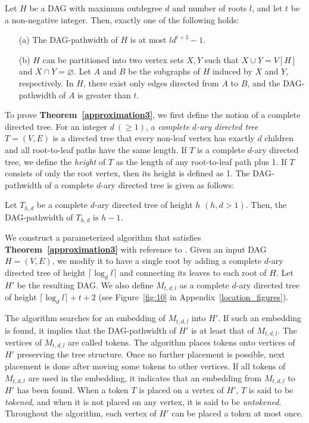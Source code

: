 \documentclass[runningheads]{llncs}
\theoremstyle{plain}
\theoremstyle{definition}
\begin{document}
\begin{theorem}\label{approximation3}
    Let $H$ be a DAG with maximum outdegree $d$ and number of roots $l$, and let $t$ be a non-negative integer. Then, exactly one of the following holds:
    \begin{enumerate}
        \item[(a)] The DAG-pathwidth of $H$ is at most $ld^{t+3}-1$.
        \item[(b)] $H$ can be partitioned into two vertex sets $X, Y$ such that $X \cup Y = V[H]$ and $X \cap Y = \varnothing$. Let $A$ and $B$ be the subgraphs of $H$ induced by $X$ and $Y$, respectively. In $H$, there exist only edges directed from $A$ to $B$, and the DAG-pathwidth of $A$ is greater than $t$.
    
    \end{enumerate}
\end{theorem}

To prove \textbf{Theorem~\ref{approximation3}}, we first define the notion of a complete directed tree. For an integer $d~(\geq 1)$, a \emph{complete $d$-ary directed tree} $T=(V, E)$ is a directed tree that every non-leaf vertex has exactly $d$ children and all root-to-leaf paths have the same length. If $T$ is a complete $d$-ary directed tree, we define the \emph{height} of $T$ as the length of any root-to-leaf path plus 1. If $T$ consists of only the root vertex, then its height is defined as 1. The DAG-pathwidth of a complete $d$-ary directed tree is given as follows: 

\begin{lemma}\label{comp_tree}
    Let $T_{h, d}$ be a complete $d$-ary directed tree of height $h$ $(h, d > 1)$. Then, the DAG-pathwidth of $T_{h, d}$ is $h-1$.
\end{lemma}

We construct a parameterized algorithm that satisfies \textbf{Theorem~\ref{approximation3}} with reference to \cite{art8}. Given an input DAG $H = (V, E)$, we modify it to have a single root by adding a complete $d$-ary directed tree of height $\lceil \log_d l \rceil$ and connecting its leaves to each root of $H$. Let $H'$ be the resulting DAG. We also define $M_{t, d, l}$ as a complete $d$-ary directed tree of height $\lceil \log_d l \rceil +t+2$ (see Figure~\ref{fig:10} in Appendix~\ref{location_figures}).

The algorithm searches for an embedding of $M_{t, d, l}$ into $H'$. If such an embedding is found, it implies that the DAG-pathwidth of $H'$ is at least that of $M_{t, d, l}$. The vertices of $M_{t, d, l}$ are called tokens. The algorithm places tokens onto vertices of $H'$ preserving the tree structure. Once no further placement is possible, next placement is done after moving some tokens to other vertices. If all tokens of $M_{t, d, l}$ are used in the embedding, it indicates that an embedding from $M_{t, d, l}$ to $H'$ has been found. When a token $T$ is placed on a vertex of $H'$, $T$ is said to be \textit{tokened}, and when it is not placed on any vertex, it is said to be \textit{untokened}. Throughout the algorithm, each vertex of $H'$ can be placed a token at most once.
\end{document}
